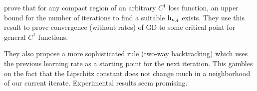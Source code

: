 \textcite[Lemma 3.1]{truongBacktrackingGradientDescent2019} prove that for any
compact region of an arbitrary \(C^1\) loss function, an upper bound for the
number of iterations to find a suitable \(\text{h}_{n_A}\) exists. They use this
result to prove convergence (without rates) of GD to some critical point for
general \(C^1\) functions.

They also propose a more sophisticated rule (two-way backtracking) which uses
the previous learning rate as a starting point for the next iteration. This
gambles on the fact that the Lipschitz constant does not change much in a
neighborhood of our current iterate. Experimental results seem promising.


\endinput